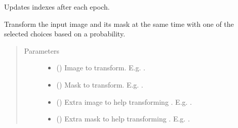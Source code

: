 \documentclass[letterpaper,10pt,english]{sphinxmanual}
\begin{document}
\begin{fulllineitems}
\begin{fulllineitems}
\label{\detokenize{data/generators/3d_generator:data.generators.data_3D_generator.VoxelDataGenerator.on_epoch_end}}
Updates indexes after each epoch.

\end{fulllineitems}


\begin{fulllineitems}
\label{\detokenize{data/generators/3d_generator:data.generators.data_3D_generator.VoxelDataGenerator.apply_transform}}
Transform the input image and its mask at the same time with one of the selected choices based on a
probability.
\begin{quote}\begin{description}
\item[{Parameters}] \leavevmode\begin{itemize}
\item {} 
 () \textendash{} Image to transform. E.g. .

\item {} 
 () \textendash{} Mask to transform. E.g. .

\item {} 
 () \textendash{} Extra image to help transforming . E.g. .

\item {} 
 () \textendash{} Extra mask to help transforming . E.g. .

\end{itemize}


\end{description}
\end{quote}
\end{fulllineitems}
\end{fulllineitems}
\end{document}
